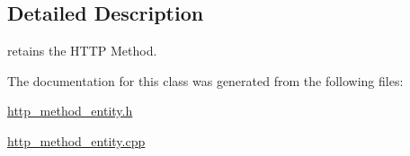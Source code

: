 \subsection{Detailed Description}
retains the H\-T\-T\-P Method. 

The documentation for this class was generated from the following files\-:\begin{DoxyCompactItemize}
\item 
\hyperlink{http__method__entity_8h}{http\-\_\-method\-\_\-entity.\-h}\item 
\hyperlink{http__method__entity_8cpp}{http\-\_\-method\-\_\-entity.\-cpp}\end{DoxyCompactItemize}

